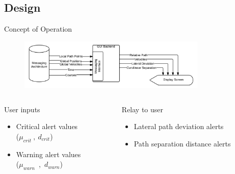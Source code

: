 \documentclass{beamer}
\begin{document}
  \subsection{Design}

    \begin{frame}{Concept of Operation}
      \begin{figure}
        \includegraphics[width=0.8\textwidth]{../graphics/blackbox_flowchart.png}
      \end{figure}
      \begin{columns}  
        \begin{column}{0.5\textwidth}
          \footnotesize User inputs
          \begin{itemize} \footnotesize
            \item Critical alert values\\ ($\mu_{crit}~,~d_{crit}$)
            \item Warning alert values\\ ($\mu_{warn}$~,~$d_{warn}$)
          \end{itemize}
        \end{column}
        \begin{column}{0.5\textwidth}
          \footnotesize Relay to user
          \begin{itemize} \footnotesize
            \item Lateral path deviation alerts
            \item Path separation distance alerts
          \end{itemize}
        \end{column}
      \end{columns}
    \end{frame}
\end{document}
